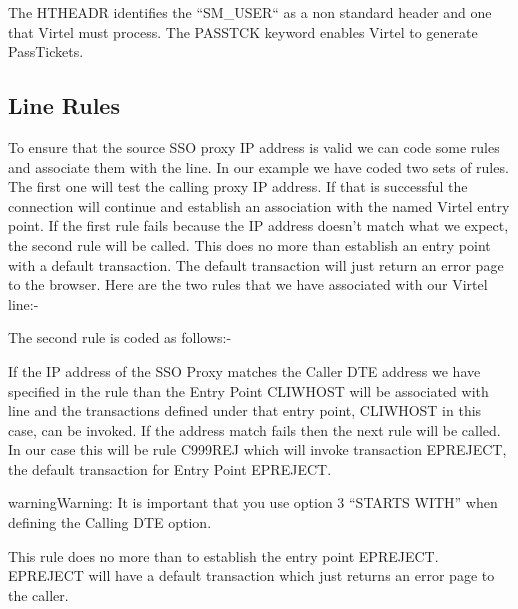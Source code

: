 \documentclass[letterpaper,10pt,english]{sphinxmanual}
\begin{document}
The HTHEADR identifies the “SM\_USER“ as a non standard header and one that Virtel must process. The PASSTCK keyword enables Virtel to generate PassTickets.

\newpage


\subsection{Line Rules}
\label{\detokenize{connectivity_guide:line-rules}}
To ensure that the source SSO proxy IP address is valid we can code some rules and associate them with the line. In our example we have coded two sets of rules. The first one will test the calling proxy IP address. If that is successful the connection will continue and establish an association with the named Virtel entry point. If the first rule fails because the IP address doesn’t match what we expect, the second rule will be called. This does no more than establish an entry point with a default transaction. The default transaction will just return an error page to the browser. Here are the two rules that we have associated with our Virtel line:-

 

The second rule is coded as follows:-

 

If the IP address of the SSO Proxy matches the Caller DTE address we have specified in the rule than the Entry Point CLIWHOST will be associated with line and the transactions defined under that entry point, CLIWHOST in this case, can be invoked. If the address match fails then the next rule will be called. In our case this will be rule C999REJ which will invoke transaction EPREJECT, the default transaction for Entry Point EPREJECT.

\begin{sphinxadmonition}{warning}{Warning:}
It is important that you use option 3 “STARTS WITH” when defining the Calling DTE option.
\end{sphinxadmonition}

 

This rule does no more than to establish the entry point EPREJECT. EPREJECT will have a default transaction which just returns an error page to the caller.
\end{document}
